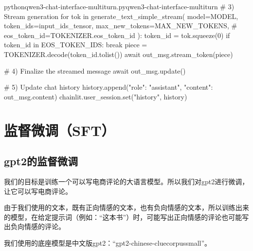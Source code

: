 \documentclass[lang=cn,newtx,10pt,scheme=chinese]{elegantbook}
\begin{document}
\begin{codebox}{python}{qwen3-chat-interface-multiturn.py}{qwen3-chat-interface-multiturn}
    # 3) Stream generation
    for tok in generate_text_simple_stream(
        model=MODEL,
        token_ids=input_ids_tensor,
        max_new_tokens=MAX_NEW_TOKENS,
        # eos_token_id=TOKENIZER.eos_token_id
    ):
        token_id = tok.squeeze(0)
        if token_id in EOS_TOKEN_IDS:
            break
        piece = TOKENIZER.decode(token_id.tolist())
        await out_msg.stream_token(piece)

    # 4) Finalize the streamed message
    await out_msg.update()

    # 5) Update chat history
    history.append({"role": "assistant", "content": out_msg.content})
    chainlit.user_session.set("history", history)
\end{codebox}

\chapter{监督微调（SFT）}

\section{gpt2的监督微调}\label{section:gpt2-sft}

我们的目标是训练一个可以写电商评论的大语言模型。所以我们对gpt2进行微调，让它可以写电商评论。

由于我们使用的文本，既有正向情感的文本，也有负向情感的文本，所以训练出来的模型，在给定提示词（例如：``这本书''）时，可能写出正向情感的评论也可能写出负向情感的评论。

\begin{marker}
我们使用的底座模型是中文版gpt2：``gpt2-chinese-cluecorpussmall''。
\end{marker}
\end{document}
